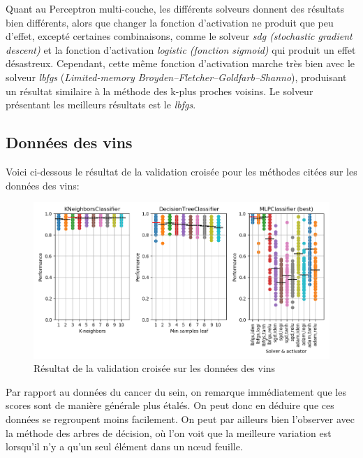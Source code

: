 \documentclass[11pt, a4paper]{article}
\begin{document}
Quant au Perceptron multi-couche, les différents solveurs donnent des résultats bien différents,
alors que changer la fonction d'activation ne produit que peu d'effet,
excepté certaines combinaisons,
comme le solveur \textit{sdg (stochastic gradient descent)} et la fonction d'activation \textit{logistic (fonction sigmoid)} qui
produit un effet désastreux.
Cependant, cette même fonction d'activation marche très bien avec le solveur \textit{lbfgs} (\textit{Limited-memory Broyden–Fletcher–Goldfarb–Shanno}),
produisant un résultat similaire à la méthode des k-plus proches voisins.
Le solveur présentant les meilleurs résultats est le \textit{lbfgs}.

\newpage

\subsection{Données des vins}

Voici ci-dessous le résultat de la validation croisée pour les méthodes citées sur les données des vins:

\begin{figure}[H]
    \begin{center}
        \includegraphics[width=1\textwidth]{ex2_wine}
    \end{center}
    \caption{Résultat de la validation croisée sur les données des vins}
    \label{Résultat de la validation croisée sur les données des vins}
\end{figure}

Par rapport au données du cancer du sein,
on remarque immédiatement que les scores sont de manière générale plus étalés.
On peut donc en déduire que ces données se regroupent moins facilement.
On peut par ailleurs bien l'observer avec la méthode des arbres de décision,
où l'on voit que la meilleure variation est lorsqu'il n'y a qu'un seul élément dans un nœud feuille. \\
\end{document}
